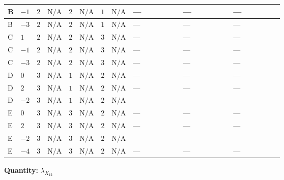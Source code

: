 \documentclass[8pt]{article}
\begin{document}
\begin{landscape}
\begin{longtable}{@{}llcccccc >{\raggedright\arraybackslash}p{0.21\linewidth} >{\raggedright\arraybackslash}p{0.21\linewidth} >{\raggedright\arraybackslash}p{0.21\linewidth}@{}}
\midrule
B & $-1$ & $2$ & $\text{N/A}$ & $2$ & $\text{N/A}$ & $1$ & $\text{N/A}$ & --- & --- & --- \\
\midrule
B & $-3$ & $2$ & $\text{N/A}$ & $2$ & $\text{N/A}$ & $1$ & $\text{N/A}$ & --- & --- & --- \\
\midrule
C & $1$ & $2$ & $\text{N/A}$ & $2$ & $\text{N/A}$ & $3$ & $\text{N/A}$ & --- & --- & --- \\
\midrule
C & $-1$ & $2$ & $\text{N/A}$ & $2$ & $\text{N/A}$ & $3$ & $\text{N/A}$ & --- & --- & --- \\
\midrule
C & $-3$ & $2$ & $\text{N/A}$ & $2$ & $\text{N/A}$ & $3$ & $\text{N/A}$ & --- & --- & --- \\
\midrule
D & $0$ & $3$ & $\text{N/A}$ & $1$ & $\text{N/A}$ & $2$ & $\text{N/A}$ & --- & --- & --- \\
\midrule
D & $2$ & $3$ & $\text{N/A}$ & $1$ & $\text{N/A}$ & $2$ & $\text{N/A}$ & --- & --- & --- \\
\midrule
D & $-2$ & $3$ & $\text{N/A}$ & $1$ & $\text{N/A}$ & $2$ & $\text{N/A}$ & \scriptsize\adjustbox{max width=\linewidth}{$\begin{gathered} +2 {\lambda_1} {\lambda_{X_{12}}}\end{gathered}$} & \scriptsize\adjustbox{max width=\linewidth}{$\begin{gathered} +4 {\lambda_{HS_1}^{(1)}} {\lambda_{X_{12}}}\end{gathered}$} & \scriptsize\adjustbox{max width=\linewidth}{$\begin{gathered} +4 {\lambda_{HS_2}^{(1)}} {\lambda_{X_{12}}}\end{gathered}$} \\
\midrule
E & $0$ & $3$ & $\text{N/A}$ & $3$ & $\text{N/A}$ & $2$ & $\text{N/A}$ & --- & --- & --- \\
\midrule
E & $2$ & $3$ & $\text{N/A}$ & $3$ & $\text{N/A}$ & $2$ & $\text{N/A}$ & --- & --- & --- \\
\midrule
E & $-2$ & $3$ & $\text{N/A}$ & $3$ & $\text{N/A}$ & $2$ & $\text{N/A}$ & \scriptsize\adjustbox{max width=\linewidth}{$\begin{gathered} +2 {\lambda_1} {\lambda_{X_{12}}}\end{gathered}$} & \scriptsize\adjustbox{max width=\linewidth}{$\begin{gathered} +4 {\lambda_{HS_1}^{(1)}} {\lambda_{X_{12}}}\end{gathered}$} & \scriptsize\adjustbox{max width=\linewidth}{$\begin{gathered} +4 {\lambda_{HS_2}^{(1)}} {\lambda_{X_{12}}}\end{gathered}$} \\
\midrule
E & $-4$ & $3$ & $\text{N/A}$ & $3$ & $\text{N/A}$ & $2$ & $\text{N/A}$ & --- & --- & --- \\
\midrule
\bottomrule
\end{longtable}
\clearpage
\noindent\textbf{Quantity: }${\lambda_{X_{12}}}$\par\smallskip

\end{landscape}
\end{document}
